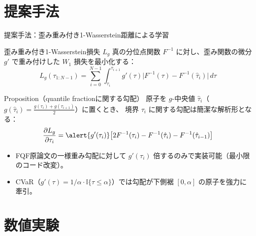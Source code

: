 \documentclass[aspectratio=169, 11pt]{beamer}
\newcommand{\green}[1]{\textcolor{green!40!black}{#1}}
\newcommand{\Finv}{F^{-1}}
\begin{document}
\section{提案手法}

\begin{frame}{提案手法：歪み重み付き1-Wasserstein距離による学習}
  \begin{block}{歪み重み付き1-Wasserstein損失 $L_g$}
    {\small
    真の分位点関数 $\Finv$ に対し、歪み関数の微分 $g'$ で重み付けした $W_1$ 損失を最小化する：
    \vspace{-4pt}
    \[
      L_g(\tau_{1:N-1}) = \sum_{i=0}^{N-1}\int_{\tau_i}^{\tau_{i+1}} g'(\tau)\bigl|\Finv(\tau) - \Finv(\hat{\tau}_i)\bigr|\,d\tau
    \]
    \vspace{-6pt}
    }
  \end{block}

  \begin{exampleblock}{Proposition（quantile fractionに関する勾配）}
    {\small
    原子を $g$-中央値 $\hat{\tau}_i$（$g(\hat{\tau}_i) = \frac{g(\tau_i)+g(\tau_{i+1})}{2}$）に置くとき、
    境界 $\tau_i$ に関する勾配は\green{簡潔な解析形}となる：
    \vspace{-4pt}
    \[
      \frac{\partial L_g}{\partial \tau_i} = \alert{g'(\tau_i)}\bigl[2\Finv(\tau_i) - \Finv(\hat{\tau}_i) - \Finv(\hat{\tau}_{i-1})\bigr]
    \]
    \vspace{-6pt}
    }
  \end{exampleblock}

  \begin{itemize}\setlength{\itemsep}{2pt}
    \item FQF原論文の一様重み勾配に対して \alert{$g'(\tau_i)$ 倍}するのみで実装可能（最小限のコード改変）。
    \item CVaR（$g'(\tau) = 1/\alpha \cdot \mathbb{I}\{\tau \le \alpha\}$）では勾配が下側裾 $[0,\alpha]$ の原子を強力に牽引。
  \end{itemize}
\end{frame}

\section{数値実験}
\end{document}
